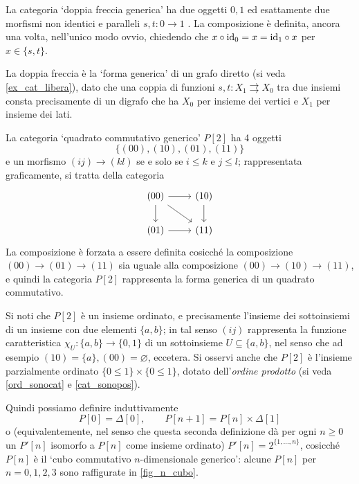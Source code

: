 \begin{example}\label{ex_cat_doppiafreccia}
	La categoria `doppia freccia generica' ha due oggetti \(0,1\) ed esattamente due morfismi non identici e paralleli \(s,t : 0\to 1\)%
	. La composizione è definita, ancora una volta, nell'unico modo ovvio, chiedendo che \(x\circ \mathrm{id}_0=x=\mathrm{id}_1\circ x\) per \(x\in\{s,t\}\).

	La doppia freccia è la `forma generica' di un grafo diretto (si veda \ref{ex_cat_libera}), dato che una coppia di funzioni \(s,t: X_1 \rightrightarrows X_0\) tra due insiemi consta precisamente di un digrafo che ha \(X_0\) per insieme dei vertici e \(X_1\) per insieme dei lati.
\end{example}
\begin{example}\label{ex_quadcuboncubo}
	La categoria `quadrato commutativo generico' \(P[2]\) ha 4 oggetti
	\[\{(00),(10),(01),(11)\} \]
	e un morfismo \((ij)\to(kl)\) se e solo se \(i\le k\) e \(j\le l\); rappresentata graficamente, si tratta della categoria
	\[\begin{tikzcd}
			(00) \ar[r]\ar[d]\ar[dr]& (10)\ar[d] \\
			(01) \ar[r]& (11)
		\end{tikzcd}\]
	La composizione è forzata a essere definita cosicché la composizione \((00)\to (01)\to (11)\) sia uguale alla composizione \((00)\to (10)\to (11)\), e quindi la categoria \(P[2]\) rappresenta la forma generica di un quadrato commutativo.

	Si noti che \(P[2]\) è un insieme ordinato, e precisamente l'insieme dei sottoinsiemi di un insieme con due elementi \(\{a,b\}\); in tal senso \((ij)\) rappresenta la funzione caratteristica \(\chi_U : \{a,b\}\to \{0,1\}\) di un sottoinsieme \(U\subseteq \{a,b\}\), nel senso che ad esempio \((10)=\{a\}, (00)=\varnothing\), eccetera. Si osservi anche che \(P[2]\) è l'insieme parzialmente ordinato \(\{0\le 1\}\times \{0\le 1\}\), dotato dell'\emph{ordine prodotto} (si veda \ref{ord_sonocat} e \ref{cat_sonopos}).

	Quindi possiamo definire induttivamente
	\[P[0] = \Delta[0], \qquad P[n+1] = P[n]\times \Delta[1]\]
	o (equivalentemente, nel senso che questa seconda definizione dà per ogni \(n\ge 0\) un \(P'[n]\) isomorfo a \(P[n]\) come insieme ordinato) \(P'[n] = 2^{\{1,\dots,n\}}\), cosicché \(P[n]\) è il `cubo commutativo \(n\)-dimensionale generico': alcune \(P[n]\) per \(n=0,1,2,3\) sono raffigurate in \ref{fig_n_cubo}.
\end{example}
